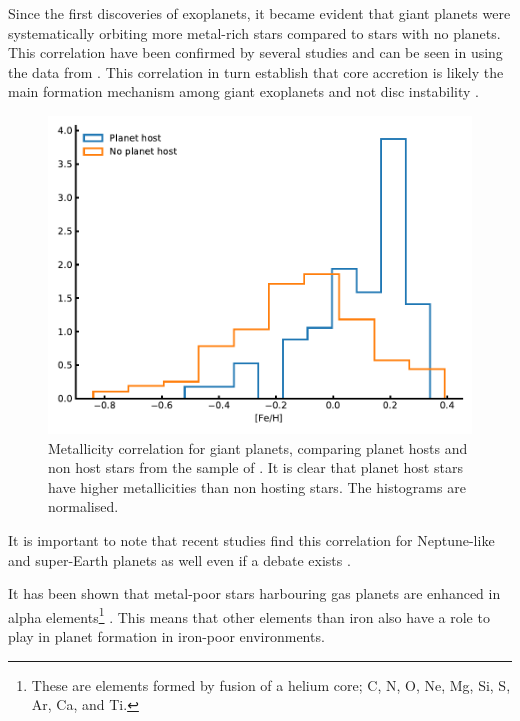 Since the first discoveries of exoplanets, it became evident that giant planets were systematically
orbiting more metal-rich stars compared to stars with no planets. This correlation have been
confirmed by several studies \citep{Gonzalez1997,Santos2004,Fischer2005,Sousa2008a,Mortier2013b} and
can be seen in  using the data from \citet{Sousa2008a}. This correlation in
turn establish that core accretion is likely the main formation mechanism among giant exoplanets
\citep{Pollack1996,Ida2004,Mordasini2012} and not disc instability \citep{Boss2002}.

\begin{figure}[htpb!]
    \centering
    \includegraphics[width=1.0\linewidth]{figures/fehCorrelation.pdf}
    \caption{Metallicity correlation for giant planets, comparing planet hosts and non host stars
             from the sample of \citet{Sousa2008a}. It is clear that planet host stars have higher
             metallicities than non hosting stars. The histograms are normalised.}
    \label{fig:fehCorrelation}
\end{figure}

It is important to note that recent studies find this correlation for Neptune-like and super-Earth
planets as well \citep{Adibekyan2012a,Wang2015,Zhu2016} even if a debate exists
\citep{Buchhave2012,Sousa2011}.

It has been shown that metal-poor stars harbouring gas planets are enhanced in alpha
elements\footnote{These are elements formed by fusion of a helium core; C, N, O, Ne, Mg, Si, S, Ar,
Ca, and Ti.} \citep[see e.g.][]{Adibekyan2012a}. This means that other elements than iron also have
a role to play in planet formation in iron-poor environments.


